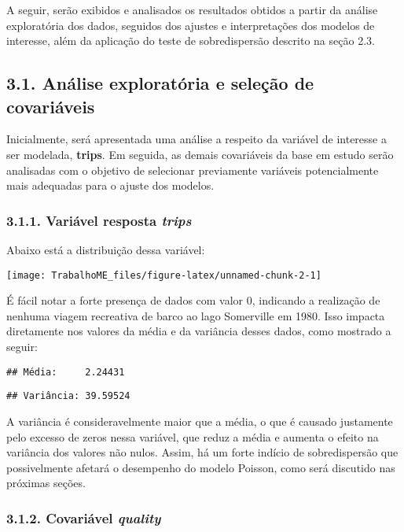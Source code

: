 \documentclass[
]{article}
\begin{document}
A seguir, serão exibidos e analisados os resultados obtidos a partir da
análise exploratória dos dados, seguidos dos ajustes e interpretações
dos modelos de interesse, além da aplicação do teste de sobredispersão
descrito na seção 2.3.

\subsection{3.1. Análise exploratória e seleção de
covariáveis}\label{anuxe1lise-exploratuxf3ria-e-seleuxe7uxe3o-de-covariuxe1veis}

Inicialmente, será apresentada uma análise a respeito da variável de
interesse a ser modelada, \textbf{trips}. Em seguida, as demais
covariáveis da base em estudo serão analisadas com o objetivo de
selecionar previamente variáveis potencialmente mais adequadas para o
ajuste dos modelos.

\subsubsection{\texorpdfstring{3.1.1. Variável resposta
\emph{trips}}{3.1.1. Variável resposta trips}}\label{variuxe1vel-resposta-trips}

Abaixo está a distribuição dessa variável:

\begin{center}\texttt{[image: TrabalhoME\_files/figure-latex/unnamed-chunk-2-1]} \end{center}

É fácil notar a forte presença de dados com valor \(0\), indicando a
realização de nenhuma viagem recreativa de barco ao lago Somerville em
1980. Isso impacta diretamente nos valores da média e da variância
desses dados, como mostrado a seguir:

\begin{verbatim}
## Média:     2.24431
\end{verbatim}

\begin{verbatim}
## Variância: 39.59524
\end{verbatim}

A variância é consideravelmente maior que a média, o que é causado
justamente pelo excesso de zeros nessa variável, que reduz a média e
aumenta o efeito na variância dos valores não nulos. Assim, há um forte
indício de sobredispersão que possivelmente afetará o desempenho do
modelo Poisson, como será discutido nas próximas seções.

\subsubsection{\texorpdfstring{3.1.2. Covariável
\emph{quality}}{3.1.2. Covariável quality}}\label{covariuxe1vel-quality}
\end{document}
